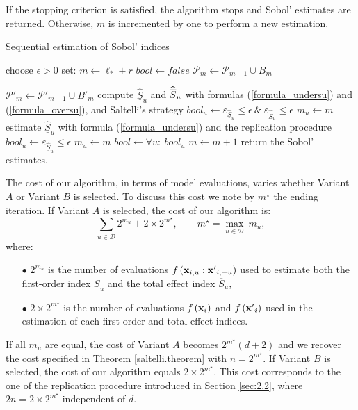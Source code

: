 If the stopping criterion is satisfied, the algorithm stops and Sobol' estimates are returned. Otherwise, $m$ is incremented by one to perform a new estimation. 
\begin{algorithm}[t]
\caption{Sequential estimation of Sobol' indices}
\begin{algorithmic}[1]
\vspace*{0.2cm}
\State choose $\epsilon >0$
\State set: $m \leftarrow \ell_*+r$
\State $bool \leftarrow false$
\State $\mathcal{P}_m \leftarrow \mathcal{P}_{m-1} \cup B_m$

\hspace*{-0.3cm} $\mathcal{P}'_m \leftarrow \mathcal{P}'_{m-1} \cup {B'}_m$
\State compute $\widehat{\underline{S}}_u$ and $\widehat{\ov{$S$}}_u$ with formulas (\ref{formula_undersu}) and (\ref{formula_oversu}), and Saltelli's strategy
\State $bool_u \leftarrow \varepsilon_{\widehat{\underline{S}}_u} \leq \epsilon \ \& \ \varepsilon_{\widehat{\overline{S}}_u} \leq \epsilon$
\State $m_u \leftarrow m$
\EndIf
\EndIf
{}
\State estimate $\widehat{\underline{S}}_u$ with formula (\ref{formula_undersu}) and the replication procedure
\State $bool_u \leftarrow \varepsilon_{\widehat{\underline{S}}_u} \leq \epsilon$
\State $m_u \leftarrow m$
\EndIf
\EndIf
\EndFor
\State $bool \leftarrow \forall u: \ bool_u$
\State $m \leftarrow m + 1$
\EndWhile
\State return the Sobol' estimates.
\end{algorithmic}
\label{recursive.algorithm}
\end{algorithm}
\bigskip

The cost of our algorithm, in terms of model evaluations, varies whether Variant $A$ or Variant $B$ is selected. To discuss this cost we note by $m^\star$ the ending iteration. If Variant $A$ is selected, the cost of our algorithm is:
\[\sum \limits_{u \in \mathcal{D}} 2^{m_u} + 2 \times 2^{m^{\star}}, \qquad m^\star= \max \limits_{u \in \mathcal{D}} \ m_u,\]
where: 
\begin{itemize}
\item[$\bullet$] $2^{m_u}$ is the number of evaluations $f\left(\boldsymbol{\mathbf{x}}_{i,u}:{\boldsymbol{\mathbf{x}}'}_{i,-u}\right)$ used to estimate both the first-order index $\underline{S}_u$ and the total effect index $\overline{S}_u$,
\item[$\bullet$] $2 \times 2^{m^{\star}}$ is the number of evaluations $f\left(\boldsymbol{\mathbf{x}}_{i}\right)$ and $f\left({\boldsymbol{\mathbf{x}}'}_{i}\right)$ used in the estimation of each first-order and total effect indices.
\end{itemize}
If all $m_u$ are equal, the cost of Variant $A$ becomes $2^{m^\star}(d+2)$ and we recover the cost specified in Theorem \ref{saltelli.theorem} with $n=2^{m^\star}$.
If Variant $B$ is selected, the cost of our algorithm equals $2 \times 2^{m^{\star}}$. This cost corresponds to the one of the replication procedure introduced in Section \ref{sec:2.2}, where $2n=2\times 2^{m^{\star}}$ independent of $d$.

